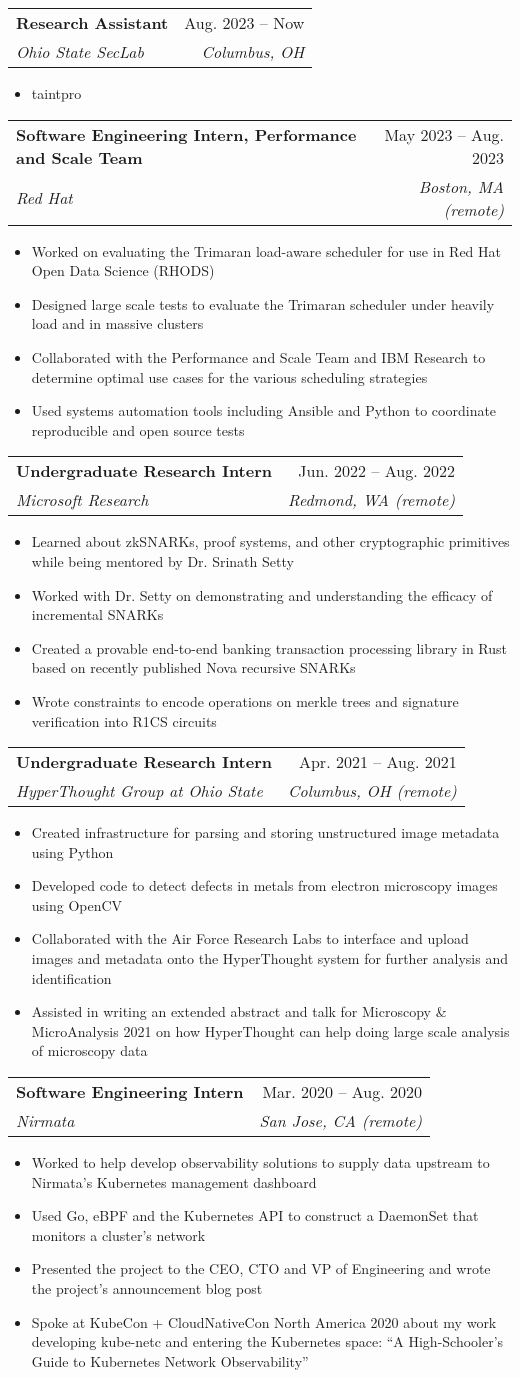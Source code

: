 \documentclass[letterpaper,11pt]{article}
\makeatletter
\newcommand{\resumeItem}[1]{
  \item\small{
    {#1 \vspace{-2pt}}
  }
}
\newcommand{\resumeSubheading}[4]{
  \vspace{-2pt}\item
    \begin{tabular*}{0.97\textwidth}[t]{l@{\extracolsep{\fill}}r}
      \textbf{#1} & #2 \\
      \textit{\small#3} & \textit{\small #4} \\
    \end{tabular*}\vspace{-7pt}
}
\newcommand{\resumeItemListStart}{\begin{itemize}}
\newcommand{\resumeItemListEnd}{\end{itemize}\vspace{-5pt}}
\makeatother
\begin{document}
    \resumeSubheading
      {Research Assistant}{Aug. 2023 -- Now}
      {Ohio State SecLab}{Columbus, OH}
      \resumeItemListStart
        \resumeItem{taintpro}
      \resumeItemListEnd

      \resumeSubheading
      {Software Engineering Intern, Performance and Scale Team}{May 2023 -- Aug. 2023}
      {Red Hat}{Boston, MA (remote)}
      \resumeItemListStart
        \resumeItem{Worked on evaluating the Trimaran load-aware scheduler for use in Red Hat Open Data Science (RHODS)}
        \resumeItem{Designed large scale tests to evaluate the Trimaran scheduler under heavily load and in massive clusters}
        \resumeItem{Collaborated with the Performance and Scale Team and IBM Research to determine optimal use cases for the various scheduling strategies}
        \resumeItem{Used systems automation tools including Ansible and Python to coordinate reproducible and open source tests}
      \resumeItemListEnd

      \resumeSubheading
      {Undergraduate Research Intern}{Jun. 2022 -- Aug. 2022}
      {Microsoft Research}{Redmond, WA (remote)}
      \resumeItemListStart
        \resumeItem{Learned about zkSNARKs, proof systems, and other cryptographic primitives while being mentored by Dr. Srinath Setty}
        \resumeItem{Worked with Dr. Setty on demonstrating and understanding the efficacy of incremental SNARKs}
        \resumeItem{Created a provable end-to-end banking transaction processing library in Rust based on recently published Nova recursive SNARKs}
        \resumeItem{Wrote constraints to encode operations on merkle trees and signature verification into R1CS circuits}
      \resumeItemListEnd

    \resumeSubheading
      {Undergraduate Research Intern}{Apr. 2021 -- Aug. 2021}
      {HyperThought Group at Ohio State}{Columbus, OH (remote)}
      \resumeItemListStart
        \resumeItem{Created infrastructure for parsing and storing unstructured image metadata using Python}
        \resumeItem{Developed code to detect defects in metals from electron microscopy images using OpenCV}
        \resumeItem{Collaborated with the Air Force Research Labs to interface and upload images and metadata onto the HyperThought system for further analysis and identification}
        \resumeItem{Assisted in writing an extended abstract and talk for Microscopy \& MicroAnalysis 2021 on how HyperThought can help doing large scale analysis of microscopy data}
      \resumeItemListEnd


    \resumeSubheading
      {Software Engineering Intern}{Mar. 2020 -- Aug. 2020}
      {Nirmata}{San Jose, CA (remote)}
      \resumeItemListStart
        \resumeItem{Worked to help develop observability solutions to supply data upstream to Nirmata's Kubernetes management dashboard}
        \resumeItem{Used Go, eBPF and the Kubernetes API to construct a DaemonSet that monitors a cluster's network}
        \resumeItem{Presented the project to the CEO, CTO and VP of Engineering and wrote the project's announcement blog post}
        \resumeItem{Spoke at KubeCon + CloudNativeCon North America 2020 about my work developing kube-netc and entering the Kubernetes space: ``A High-Schooler's Guide to Kubernetes Network Observability''}
      \resumeItemListEnd
\end{document}
